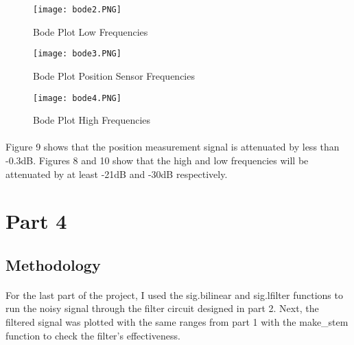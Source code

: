   \begin{figure}[H]
    \centering
   \texttt{[image: bode2.PNG]}
    \caption{Bode Plot Low Frequencies}
  \end{figure}
  

   \begin{figure}[H]
     \centering
   \texttt{[image: bode3.PNG]}
     \caption{Bode Plot Position Sensor Frequencies}
   \end{figure}
   

    \begin{figure}[H]
      \centering
		\texttt{[image: bode4.PNG]}
     \caption{Bode Plot High Frequencies}
    \end{figure}

\paragraph{}
Figure 9 shows that the position measurement signal is attenuated by less than -0.3dB.  Figures 8 and 10 show that the high and low frequencies will be attenuated by at least -21dB and -30dB respectively.

\section{Part 4}
\subsection{Methodology}
\paragraph{}
For the last part of the project, I used the sig.bilinear and sig.lfilter functions to run the noisy signal through the filter circuit designed in part 2.  Next, the filtered signal was plotted with the same ranges from part 1 with the make\_stem function to check the filter's effectiveness.

